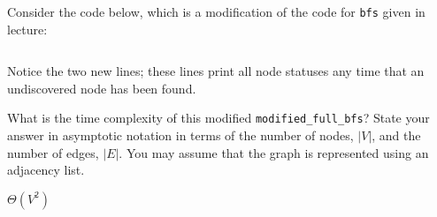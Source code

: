 \begin{prob}
    Consider the code below, which is a modification of the code for
    \texttt{bfs} given in lecture:

    \inputminted{python}{./code.py}

    Notice the two new lines; these lines print all node statuses any time that
    an undiscovered node has been found.

    What is the time complexity of this modified \texttt{modified_full_bfs}?
    State your answer in asymptotic notation in terms of the number of nodes,
    $|V|$, and the number of edges, $|E|$. You may assume that the graph is
    represented using an adjacency list.

    \begin{soln}
        $\Theta(V^2)$
    \end{soln}

\end{prob}
